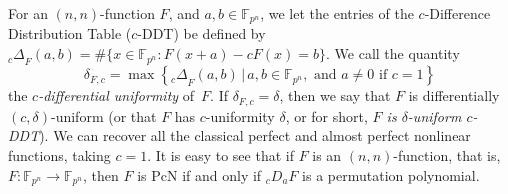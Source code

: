 \documentclass[11pt]{article}
\def\F{{\mathbb F}}
\newcommand{\cardinality}[1]{\# #1}
\begin{document}
For an $(n,n)$-function $F$, and $a,b\in\F_{p^n}$, we let the entries of the $c$-Difference Distribution Table ($c$-DDT) be defined by ${_c\Delta}_F(a,b)=\cardinality{\{x\in\F_{p^n} : F(x+a)-cF(x)=b\}}$. We call the quantity
\[
\delta_{F,c}=\max\left\{{_c\Delta}_F(a,b)\,|\, a,b\in \F_{p^n}, \text{ and } a\neq 0 \text{ if $c=1$} \right\}\]
the {\em $c$-differential uniformity} of~$F$. If $\delta_{F,c}=\delta$, then we say that $F$ is differentially $(c,\delta)$-uniform (or that $F$ has $c$-uniformity $\delta$, or for short, {\em $F$ is $\delta$-uniform $c$-DDT}). We can recover all the classical perfect and almost perfect nonlinear functions, taking $c=1$.
It is easy to see that if $F$ is an $(n,n)$-function, that is, $F:\F_{p^n}\to\F_{p^n}$, then $F$ is PcN if and only if $_cD_a F$ is a permutation polynomial.
\end{document}
